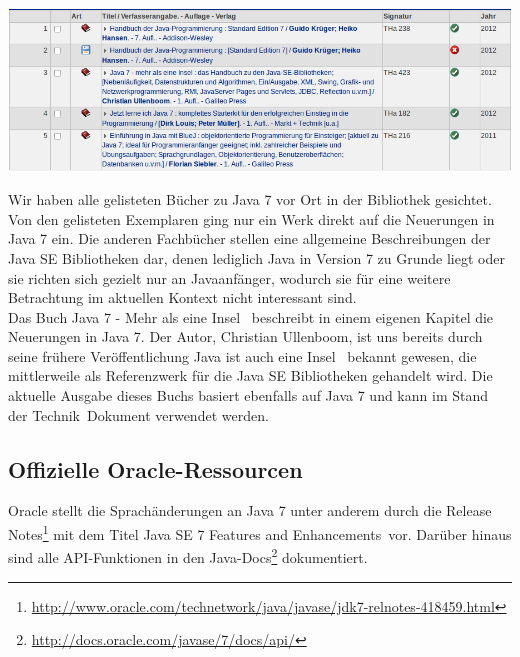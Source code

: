 \begin{center}
\includegraphics[width=\textwidth]{images/dhbw-lib-search-results.png}
\end{center}

Wir haben alle gelisteten Bücher zu Java 7 vor Ort in der Bibliothek gesichtet. Von den gelisteten Exemplaren ging nur ein Werk\cite{javainsel2} direkt auf die Neuerungen in Java 7 ein. Die anderen Fachbücher stellen eine allgemeine Beschreibungen der Java SE Bibliotheken dar, denen lediglich Java in Version 7 zu Grunde liegt\cite{dhLibHandbuchJava} oder sie richten sich gezielt nur an Javaanfänger\cite{dhLibJetztJavaLernen}\cite{dhLibBlueJStart}, wodurch sie für eine weitere Betrachtung im aktuellen Kontext nicht interessant sind.\\

Das Buch \glqq Java 7 - Mehr als eine Insel\grqq\cite{javainsel2} ~beschreibt in einem eigenen Kapitel die Neuerungen in Java 7. Der Autor, Christian Ullenboom, ist uns bereits durch seine frühere Veröffentlichung \glqq Java ist auch eine Insel\grqq\cite{javainsel1} ~bekannt gewesen, die mittlerweile als Referenzwerk für die Java SE Bibliotheken gehandelt wird. Die aktuelle Ausgabe dieses Buchs basiert ebenfalls auf Java 7 und kann im \glqq Stand der Technik\grqq ~Dokument verwendet werden.

\subsection*{Offizielle Oracle-Ressourcen}\label{oracle}
Oracle stellt die Sprachänderungen an Java 7 unter anderem durch die Release
Notes\footnote{\url{http://www.oracle.com/technetwork/java/javase/jdk7-relnotes-418459.html}} mit dem Titel 
\glqq Java SE 7 Features and Enhancements\grqq\cite{oracleJavaRel}~vor. Darüber hinaus sind alle API-Funktionen in den 
Java-Docs\footnote{\url{http://docs.oracle.com/javase/7/docs/api/}}\cite{javadocs} dokumentiert.\\

